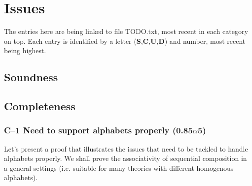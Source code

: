 \chapter{Issues}

The entries here are being linked to file TODO.txt, most recent
in each category on top.
Each entry is identified by a letter
(\textbf{S},\textbf{C},\textbf{U},\textbf{D}) and number,
most recent being highest.

\section{Soundness}

\section{Completeness}

\subsection*{C--1 Need to support alphabets properly (0.85$\alpha$5)}

Let's present a proof that illustrates the issues that need to be tackled
to handle alphabets properly.
We shall prove the associativity of sequential composition
in a general settings
(i.e. suitable for many theories with different homogenous alphabets).

